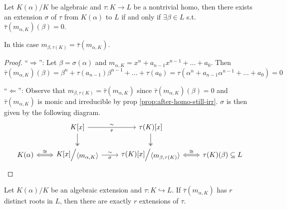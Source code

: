 \begin{lemma} \label{lemma:extension-exists-condition}
  Let $K(\alpha) / K$ be algebraic and $\tau: K \to L$ be a nontrivial homo,
  then there exists an extension $\sigma$ of $\tau$ from $K(\alpha)$ to $L$ if
  and only if $\exists \beta \in L$ s.t. $\bar\tau(m_{\alpha, K})(\beta) = 0$.

  In this case $m_{\beta, \tau(K)} = \bar\tau(m_{\alpha, K})$.

\begin{proof}
  ``$\Rightarrow$'': Let $\beta = \sigma(\alpha)$ and $m_{\alpha, K} = x^n + a_{n-1} x^{n-1} + \dots + a_0$.
  Then $\bar\tau(m_{\alpha, K})(\beta) = \beta^n + \tau(a_{n-1})\beta^{n-1} + \dots + \tau(a_0)
  = \tau(\alpha^n + a_{n-1} \alpha^{n-1} + \dots + a_0) = 0$

  ``$\Leftarrow$'': Observe that $m_{\beta, \tau(K)} = \bar\tau(m_{\alpha, K})$ since
  $\bar\tau(m_{\alpha, K})(\beta) = 0$ and $\bar\tau(m_{\alpha, K})$ is monic and irreducible
  by prop \ref{prop:after-homo-still-irr}. $\sigma$ is then given by the following diagram.
  \[
    \begin{tikzcd}
      & K[x] \arrow[r, "\sim", "\bar\tau"'] \arrow[d, two heads]
      & \tau(K)[x] \arrow[d, two heads] \\
      K(\alpha) \arrow[r, Leftrightarrow, "\cong"]
      & \raisebox{.1em}{$K[x]$} \Big/ \raisebox{-.1em}{$\gen{ m_{\alpha, K} }$}
      \arrow[r, "\sim", "\sigma"']
      & \raisebox{.1em}{$\tau(K)[x]$} \Big/ \raisebox{-.1em}{$\gen{ m_{\beta, \tau(K)} }$}
      \arrow[r, Leftrightarrow, "\cong"]
      & \tau(K)(\beta) \subseteq L
    \end{tikzcd}
  \]
\end{proof}
\end{lemma}

\begin{coro} \label{coro:num-of-extensions}
  Let $K(\alpha)/K$ be an algebraic extension and $\tau: K \hookrightarrow L$.
  If $\bar\tau(m_{\alpha, K})$ has $r$ distinct roots in $L$, then there are exactly $r$ extensions of $\tau$.
\end{coro}

